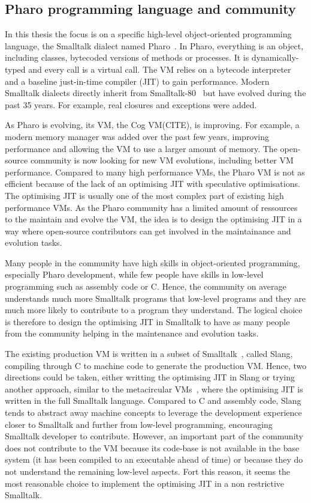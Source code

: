 \documentclass[a4paper,12pt,twoside]{../includes/ThesisStyle}
\begin{document}
\subsection{Pharo programming language and community}

In this thesis the focus is on a specific high-level object-oriented programming language, the Smalltalk dialect named Pharo~\cite{Blac09a}. In Pharo, everything is an object, including classes, bytecoded versions of methods or processes. It is dynamically-typed and every call is a virtual call. The VM relies on a bytecode interpreter and a baseline just-in-time compiler (JIT) to gain performance. Modern Smalltalk dialects directly inherit from Smalltalk-80~\cite{Gold83a} but have evolved during the past 35 years. For example, real closures and exceptions were added.

As Pharo is evolving, its VM, the Cog VM(CITE), is improving. For example, a modern memory manager was added over the past few years, improving performance and allowing the VM to use a larger amount of memory. The open-source community is now looking for new VM evolutions, including better VM performance. Compared to many high performance VMs, the Pharo VM is not as efficient because of the lack of an optimising JIT with speculative optimisations. The optimising JIT is usually one of the most complex part of existing high performance VMs. As the Pharo community has a limited amount of ressources to the maintain and evolve the VM, the idea is to design the optimising JIT in a way where open-source contributors can get involved in the maintainance and evolution tasks.

Many people in the community have high skills in object-oriented programming, especially Pharo development, while few people have skills in low-level programming such as assembly code or C. Hence, the community on average understands much more Smalltalk programs that low-level programs and they are much more likely to contribute to a program they understand. The logical choice is therefore to design the optimising JIT in Smalltalk to have as many people from the community helping in the maintenance and evolution tasks.

The existing production VM is written in a subset of Smalltalk~\cite{Inga97a}, called Slang, compiling through C to machine code to generate the production VM. Hence, two directions could be taken, either writting the optimising JIT in Slang or trying another approach, similar to the metacircular VMs~\cite{Unga05b,Wimm13a,Alp99a}, where the optimising JIT is written in the full Smalltalk language. Compared to C and assembly code, Slang tends to abstract away machine concepts to leverage the development experience closer to Smalltalk and further from low-level programming, encouraging Smalltalk developer to contribute. However, an important part of the community does not contribute to the VM because its code-base is not available in the base system (it has been compiled to an executable ahead of time) or because they do not understand the remaining low-level aspects. Fort this reason, it seems the most reasonable choice to implement the optimising JIT in a non restrictive Smalltalk.
\end{document}
